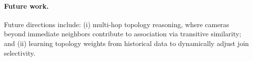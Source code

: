 \documentclass[11pt]{article}
\begin{document}
\paragraph{Future work.}
Future directions include: (i) multi-hop topology reasoning, where cameras beyond immediate neighbors contribute to association via transitive similarity; and (ii) learning topology weights from historical data to dynamically adjust join selectivity.



\end{document}
